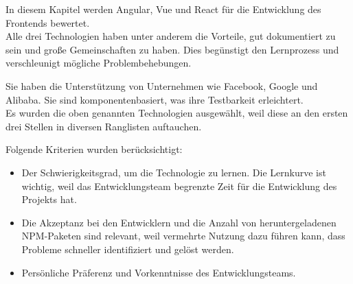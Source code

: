 \begin{flushleft}
In diesem Kapitel werden Angular, Vue und React für die Entwicklung des Frontends bewertet. 
\\
Alle drei Technologien haben unter anderem die Vorteile, gut dokumentiert zu sein und große Gemeinschaften zu haben. Dies begünstigt den Lernprozess und verschleunigt mögliche Problembehebungen.

\begin{flushleft}
Sie haben die Unterstützung von Unternehmen wie Facebook, Google und Alibaba. Sie sind komponentenbasiert, was ihre Testbarkeit erleichtert.
\\
Es wurden die oben genannten Technologien ausgewählt, weil diese an den ersten drei Stellen in diversen Ranglisten auftauchen{\cite{SO01}}.
\end{flushleft}

  Folgende Kriterien wurden berücksichtigt:
  \begin{itemize}
    \item
          Der Schwierigkeitsgrad, um die Technologie zu lernen. 
          Die Lernkurve ist wichtig, weil das Entwicklungsteam begrenzte Zeit für die Entwicklung des Projekts hat. 


    \item
          Die Akzeptanz bei den Entwicklern und die Anzahl von heruntergeladenen NPM-Paketen sind relevant, weil vermehrte Nutzung dazu führen kann, dass Probleme schneller identifiziert und gelöst werden.{\cite{LIN1}}

          
      
    \item
          Persönliche Präferenz und Vorkenntnisse des Entwicklungsteams. 
  \end{itemize}

\end{flushleft}

